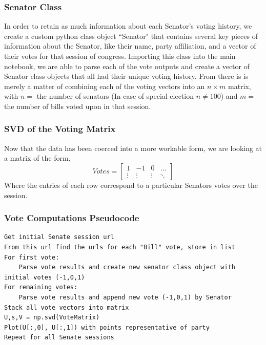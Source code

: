 \documentclass[letterpaper,12pt]{article}
\begin{document}
\subsubsection{Senator Class}
In order to retain as much information about each Senator's voting history, we create a custom python class object ``Senator" that contains several key pieces of information about the Senator, like their name, party affiliation, and a vector of their votes for that session of congress. Importing this class into the main notebook, we are able to parse each of the vote outputs and create a vector of Senator class objects that all had their unique voting history. From there is is merely a matter of combining each of the voting vectors into an $n\times m$ matrix, with $n=$ the number of senators (In case of special election $n\neq 100$) and $m=$ the number of bills voted upon in that session.
\subsubsection{SVD of the Voting Matrix}
Now that the data has been coerced into a more workable form, we are looking at a matrix of the form,
\[Votes=\begin{bmatrix}
1 & -1 & 0 & \ldots\\
\vdots & \vdots & \vdots & \ddots
\end{bmatrix} \]
Where the entries of each row correspond to a particular Senators votes over the session. 
\subsubsection{Vote Computations Pseudocode}
\begin{verbatim}
Get initial Senate session url
From this url find the urls for each "Bill" vote, store in list
For first vote:
    Parse vote results and create new senator class object with initial votes (-1,0,1)
For remaining votes:
    Parse vote results and append new vote (-1,0,1) by Senator
Stack all vote vectors into matrix
U,s,V = np.svd(VoteMatrix)
Plot(U[:,0], U[:,1]) with points representative of party
Repeat for all Senate sessions
\end{verbatim}
\end{document}
